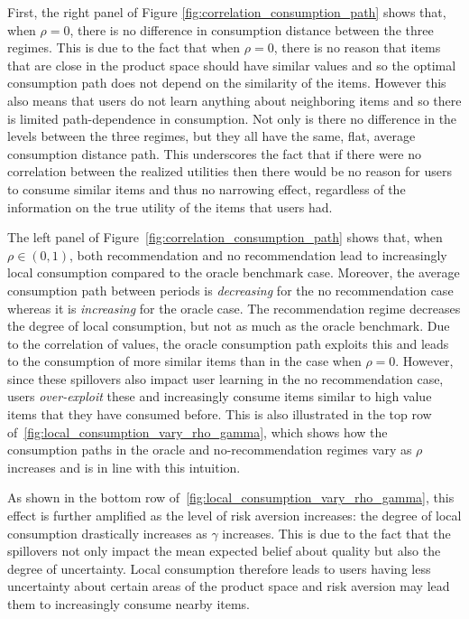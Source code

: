 \documentclass[sigconf]{acmart}
\begin{document}

First, the right panel of Figure \ref{fig:correlation_consumption_path} shows that, when $\rho = 0$, there is no difference in consumption distance between the three regimes. This is due to the fact that when $\rho = 0$, there is no reason that items that are close in the product space should have similar values and so the optimal consumption path does not depend on the similarity of the items. However this also means that users do not learn anything about neighboring items and so there is limited path-dependence in consumption. Not only is there no difference in the levels between the three regimes, but they all have the same, flat, average consumption distance path. This underscores the fact that if there were no correlation between the realized utilities then there would be no reason for users to consume similar items and thus no narrowing effect, regardless of the information on the true utility of the items that users had.


The left panel of Figure~\ref{fig:correlation_consumption_path} shows that, when $\rho \in (0,1)$, both recommendation and no recommendation lead to increasingly local consumption compared to the oracle benchmark case. Moreover, the average consumption path between periods is \textit{decreasing} for the no recommendation case whereas it is \textit{increasing} for the oracle case. The recommendation regime decreases the degree of local consumption, but not as much as the oracle benchmark. Due to the correlation of values, the oracle consumption path exploits this and leads to the consumption of more similar items than in the case when $\rho = 0$. However, since these spillovers also impact user learning in the no recommendation case, users \textit{over-exploit} these and increasingly consume items similar to high value items that they have consumed before. This is also illustrated in the top row of~\autoref{fig:local_consumption_vary_rho_gamma}, which shows how the consumption paths in the oracle and no-recommendation regimes vary as $\rho$ increases and is in line with this intuition.


As shown in the bottom row of~\autoref{fig:local_consumption_vary_rho_gamma}, this effect is further amplified as the level of risk aversion increases: the degree of local consumption drastically increases as $\gamma$ increases. This is due to the fact that the spillovers not only impact the mean expected belief about quality but also the degree of uncertainty. Local consumption therefore leads to users having less uncertainty about certain areas of the product space and risk aversion may lead them to increasingly consume nearby items.
\end{document}

